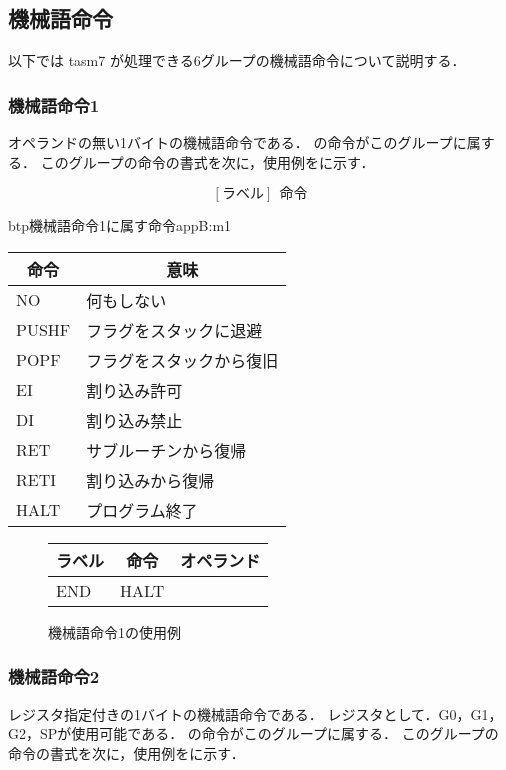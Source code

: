 \subsection{機械語命令}
以下では tasm7 が処理できる6グループの機械語命令について説明する．

\subsubsection{機械語命令1}
オペランドの無い1バイトの機械語命令である．
の命令がこのグループに属する．
このグループの命令の書式を次に，使用例をに示す．

{\small\[ %
[ラベル]~~ 命令 \]}

\begin{mytable}{btp}{機械語命令1に属す命令}{appB:m1}
{\small\begin{tabular}{l|l}
\hline\hline
\multicolumn{1}{c|}{命令} & \multicolumn{1}{c}{意味} \\\hline
NO & 何もしない \\
PUSHF & フラグをスタックに退避 \\
POPF & フラグをスタックから復旧 \\
EI & 割り込み許可 \\
DI & 割り込み禁止 \\
RET & サブルーチンから復帰 \\
RETI & 割り込みから復帰 \\
HALT & プログラム終了
\end{tabular}}
\end{mytable}

\begin{figure}[btp]
\begin{center}
{\tt\small\begin{tabular}{|l|l|l|}
\hline
\multicolumn{1}{|c|}{ラベル} & 
        \multicolumn{1}{c|}{命令} & \multicolumn{1}{c|}{オペランド} \\\hline
END  & HALT &  \\\hline
\end{tabular}}
\caption{機械語命令1の使用例}
\label{fig:appB:m1ex}
\end{center}
\end{figure}

\subsubsection{機械語命令2}
レジスタ指定付きの1バイトの機械語命令である．
レジスタとして．G0，G1，G2，SPが使用可能である．
の命令がこのグループに属する．
このグループの命令の書式を次に，使用例をに示す．

